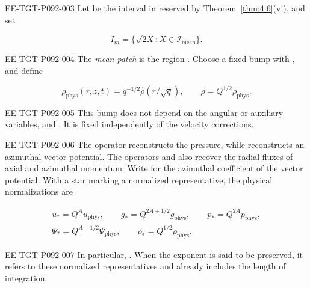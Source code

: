 \begin{EESegment}{EE-TGT-P092-003}
Let  be the interval in
 reserved by Theorem~\ref{thm:4.6}(vi), and set
\end{EESegment}
\[
I_m=\{\sqrt{2X}:X\in \mathcal I_{\mathrm{mean}}\}.
\]
\begin{EESegment}{EE-TGT-P092-004}
The \emph{mean patch} is the region . Choose a fixed bump
 with
, and define
\end{EESegment}
\[
\rho_{\mathrm{phys}}(r,z,t)=q^{-1/2}\widehat\rho(r/\sqrt q),
\qquad \rho=Q^{1/2}\rho_{\mathrm{phys}}.
\]
\begin{EESegment}{EE-TGT-P092-005}
This bump does not depend on the angular or auxiliary variables, and
. It is fixed independently of
the velocity corrections.
\end{EESegment}

\begin{EESegment}{EE-TGT-P092-006}
The operator  reconstructs the pressure, while
 reconstructs an azimuthal vector potential. The operators
 and  also recover the radial
fluxes of axial and azimuthal momentum. Write  for the azimuthal
coefficient of the vector potential. With a star marking a normalized representative, the physical
normalizations are
\end{EESegment}
\begin{equation}
\begin{gathered}
u_*=Q^A u_{\mathrm{phys}},\qquad
g_*=Q^{2A+1/2}g_{\mathrm{phys}},\qquad
p_*=Q^{2A}p_{\mathrm{phys}},\\
\Psi_*=Q^{A-1/2}\Psi_{\mathrm{phys}},\qquad
\rho_*=Q^{1/2}\rho_{\mathrm{phys}}.
\end{gathered}
\tag{8.11}\label{eq:8.11}
\end{equation}
\begin{EESegment}{EE-TGT-P092-007}
In particular,
.
When the  exponent is said to be preserved, it refers to these
normalized representatives and already includes the length of integration.
\end{EESegment}

